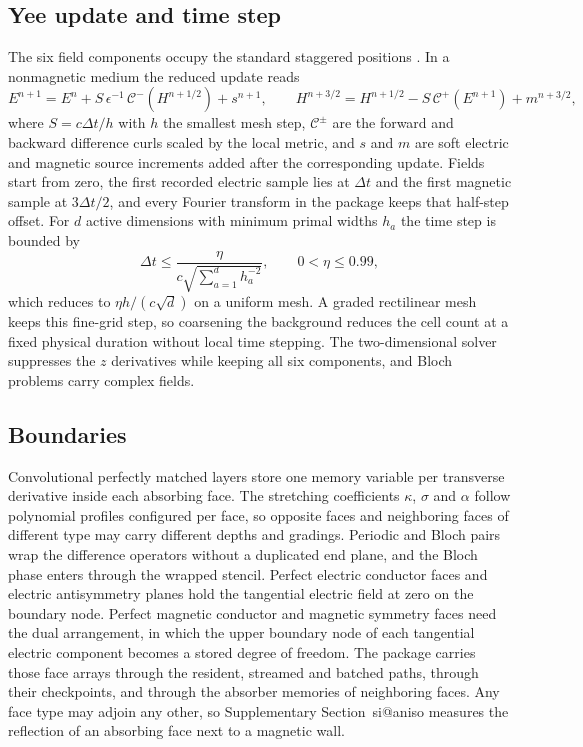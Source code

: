 \documentclass[preprint,11pt]{elsarticle}
\makeatletter
\newcommand{\suppsec}[1]{Supplementary Section~\csname si@#1\endcsname}
\makeatother
\begin{document}
\subsection{Yee update and time step}

The six field components occupy the standard staggered positions \citep{yee1966}. In a nonmagnetic medium the reduced update reads
\begin{equation}
E^{n+1}=E^{n}+S\,\epsilon^{-1}\,\mathcal{C}^{-}\!\left(H^{n+1/2}\right)+s^{n+1},\qquad
H^{n+3/2}=H^{n+1/2}-S\,\mathcal{C}^{+}\!\left(E^{n+1}\right)+m^{n+3/2},
\label{eq:yee}
\end{equation}
where $S=c\Delta t/h$ with $h$ the smallest mesh step, $\mathcal{C}^{\pm}$ are the forward and backward difference curls scaled by the local metric, and $s$ and $m$ are soft electric and magnetic source increments added after the corresponding update. Fields start from zero, the first recorded electric sample lies at $\Delta t$ and the first magnetic sample at $3\Delta t/2$, and every Fourier transform in the package keeps that half-step offset. For $d$ active dimensions with minimum primal widths $h_a$ the time step is bounded by
\begin{equation}
\Delta t\leq\frac{\eta}{c\sqrt{\sum_{a=1}^{d}h_a^{-2}}},\qquad 0<\eta\leq0.99,
\label{eq:cfl}
\end{equation}
which reduces to $\eta h/(c\sqrt{d})$ on a uniform mesh. A graded rectilinear mesh keeps this fine-grid step, so coarsening the background reduces the cell count at a fixed physical duration without local time stepping. The two-dimensional solver suppresses the $z$ derivatives while keeping all six components, and Bloch problems carry complex fields.

\subsection{Boundaries}

Convolutional perfectly matched layers \citep{roden2000} store one memory variable per transverse derivative inside each absorbing face. The stretching coefficients $\kappa$, $\sigma$ and $\alpha$ follow polynomial profiles configured per face, so opposite faces and neighboring faces of different type may carry different depths and gradings. Periodic and Bloch pairs wrap the difference operators without a duplicated end plane, and the Bloch phase enters through the wrapped stencil. Perfect electric conductor faces and electric antisymmetry planes hold the tangential electric field at zero on the boundary node. Perfect magnetic conductor and magnetic symmetry faces need the dual arrangement, in which the upper boundary node of each tangential electric component becomes a stored degree of freedom. The package carries those face arrays through the resident, streamed and batched paths, through their checkpoints, and through the absorber memories of neighboring faces. Any face type may adjoin any other, so \suppsec{aniso} measures the reflection of an absorbing face next to a magnetic wall.
\end{document}
